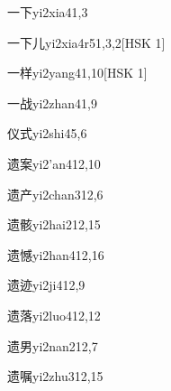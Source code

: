 \begin{entry}{一下}{yi2xia4}{1,3}
\end{entry}

\begin{entry}{一下儿}{yi2xia4r5}{1,3,2}[HSK 1]
\end{entry}

\begin{entry}{一样}{yi2yang4}{1,10}[HSK 1]
\end{entry}

\begin{entry}{一战}{yi2zhan4}{1,9}
\end{entry}

\begin{entry}{仪式}{yi2shi4}{5,6}
\end{entry}

\begin{entry}{遗案}{yi2'an4}{12,10}
\end{entry}

\begin{entry}{遗产}{yi2chan3}{12,6}
\end{entry}

\begin{entry}{遗骸}{yi2hai2}{12,15}
\end{entry}

\begin{entry}{遗憾}{yi2han4}{12,16}
\end{entry}

\begin{entry}{遗迹}{yi2ji4}{12,9}
\end{entry}

\begin{entry}{遗落}{yi2luo4}{12,12}
\end{entry}

\begin{entry}{遗男}{yi2nan2}{12,7}
\end{entry}

\begin{entry}{遗嘱}{yi2zhu3}{12,15}
\end{entry}


